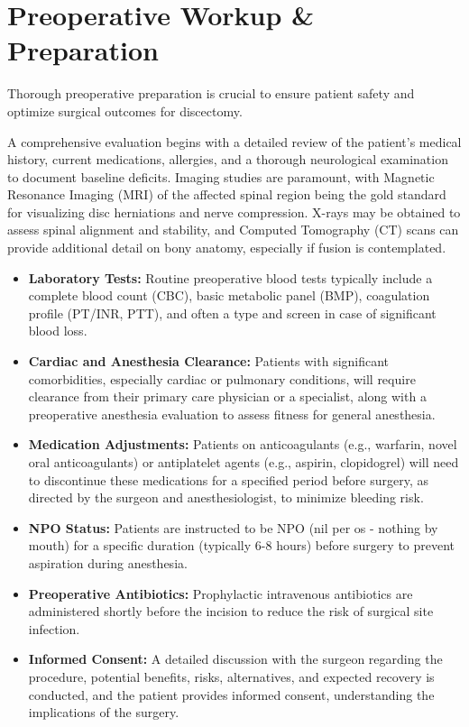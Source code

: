 \section*{Preoperative Workup \& Preparation}
Thorough preoperative preparation is crucial to ensure patient safety and optimize surgical outcomes for discectomy.

A comprehensive evaluation begins with a detailed review of the patient's medical history, current medications, allergies, and a thorough neurological examination to document baseline deficits. Imaging studies are paramount, with Magnetic Resonance Imaging (MRI) of the affected spinal region being the gold standard for visualizing disc herniations and nerve compression. X-rays may be obtained to assess spinal alignment and stability, and Computed Tomography (CT) scans can provide additional detail on bony anatomy, especially if fusion is contemplated.

\begin{itemize}
  \item \textbf{Laboratory Tests:} Routine preoperative blood tests typically include a complete blood count (CBC), basic metabolic panel (BMP), coagulation profile (PT/INR, PTT), and often a type and screen in case of significant blood loss.
  \item \textbf{Cardiac and Anesthesia Clearance:} Patients with significant comorbidities, especially cardiac or pulmonary conditions, will require clearance from their primary care physician or a specialist, along with a preoperative anesthesia evaluation to assess fitness for general anesthesia.
  \item \textbf{Medication Adjustments:} Patients on anticoagulants (e.g., warfarin, novel oral anticoagulants) or antiplatelet agents (e.g., aspirin, clopidogrel) will need to discontinue these medications for a specified period before surgery, as directed by the surgeon and anesthesiologist, to minimize bleeding risk.
  \item \textbf{NPO Status:} Patients are instructed to be NPO (nil per os - nothing by mouth) for a specific duration (typically 6-8 hours) before surgery to prevent aspiration during anesthesia.
  \item \textbf{Preoperative Antibiotics:} Prophylactic intravenous antibiotics are administered shortly before the incision to reduce the risk of surgical site infection.
  \item \textbf{Informed Consent:} A detailed discussion with the surgeon regarding the procedure, potential benefits, risks, alternatives, and expected recovery is conducted, and the patient provides informed consent, understanding the implications of the surgery.
\end{itemize}

